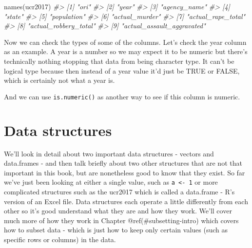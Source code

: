 \documentclass[
]{krantz}
\makeatletter
\newenvironment{Shaded}{\begin{snugshade}}{\end{snugshade}}
\newcommand{\CommentTok}[1]{\textcolor[rgb]{0.37,0.37,0.37}{\textit{#1}}}
\newcommand{\FunctionTok}[1]{\textcolor[rgb]{0,0,0}{#1}}
\newcommand{\NormalTok}[1]{#1}
\newcommand{\SpecialCharTok}[1]{\textcolor[rgb]{0,0,0}{#1}}
\newenvironment{kframe}{%
\medskip{}
\setlength{\fboxsep}{.8em}
 \def\at@end@of@kframe{}%
 \ifinner\ifhmode%
  \def\at@end@of@kframe{\end{minipage}}%
  \begin{minipage}{\columnwidth}%
 \fi\fi%
 \def\FrameCommand##1{\hskip\@totalleftmargin \hskip-\fboxsep
 \colorbox{shadecolor}{##1}\hskip-\fboxsep
     \hskip-\linewidth \hskip-\@totalleftmargin \hskip\columnwidth}%
 \MakeFramed {\advance\hsize-\width
   \@totalleftmargin\z@ \linewidth\hsize
   \@setminipage}}%
 {\par\unskip\endMakeFramed%
 \at@end@of@kframe}
\renewenvironment{Shaded}{\begin{kframe}}{\end{kframe}}
\makeatother
\begin{document}
\begin{Shaded}
\begin{Highlighting}[]
\FunctionTok{names}\NormalTok{(ucr2017)}
\CommentTok{\#\textgreater{} [1] "ori"                      }
\CommentTok{\#\textgreater{} [2] "year"                     }
\CommentTok{\#\textgreater{} [3] "agency\_name"              }
\CommentTok{\#\textgreater{} [4] "state"                    }
\CommentTok{\#\textgreater{} [5] "population"               }
\CommentTok{\#\textgreater{} [6] "actual\_murder"            }
\CommentTok{\#\textgreater{} [7] "actual\_rape\_total"        }
\CommentTok{\#\textgreater{} [8] "actual\_robbery\_total"     }
\CommentTok{\#\textgreater{} [9] "actual\_assault\_aggravated"}
\end{Highlighting}
\end{Shaded}

Now we can check the types of some of the columns. Let's check the year column as an example. A year is a number so we may expect it to be numeric but there's technically nothing stopping that data from being character type. It can't be logical type because then instead of a year value it'd just be TRUE or FALSE, which is certainly not what a year is.

\begin{Shaded}
\end{Shaded}

And we can use \texttt{is.numeric()} as another way to see if this column is numeric.

\begin{Shaded}
\end{Shaded}

\hypertarget{data-structures}{%
\section{Data structures}\label{data-structures}}

We'll look in detail about two important data structures - vectors and data.frames - and then talk briefly about two other structures that are not that important in this book, but are nonetheless good to know that they exist. So far we've just been looking at either a single value, such as \texttt{a\ \textless{}-\ 1} or more complicated structures such as the ucr2017 which is called a data.frame - R's version of an Excel file. Data structures each operate a little differently from each other so it's good understand what they are and how they work. We'll cover much more of how they work in Chapter @ref(\#subsetting-intro) which covers how to subset data - which is just how to keep only certain values (such as specific rows or columns) in the data.
\end{document}
